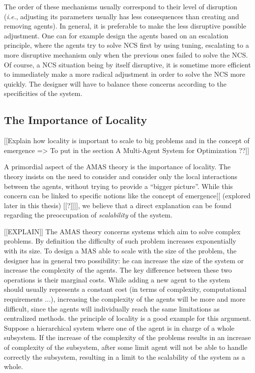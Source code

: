 The order of these mechanisms usually correspond to their level of disruption (\textit{i.e.}, adjusting its parameters usually has less consequences than creating and removing agents). In general, it is preferable to make the less disruptive possible adjustment. One can for example design the agents based on an escalation principle, where the agents try to solve NCS first by using tuning, escalating to a more disruptive mechanism only when the previous ones failed to solve the NCS. Of course, a NCS situation being by itself disruptive, it is sometime more efficient to immediately make a more radical adjustment in order to solve the NCS more quickly. The designer will have to balance these concerns according to the specificities of the system.

\subsection{The Importance of Locality}
[[Explain how locality is important to scale to big problems and in the concept of emergence => To put in the section A Multi-Agent System for Optimization ??]]

A primordial aspect of the AMAS theory is the importance of locality. The theory insists on the need to consider and consider only the local interactions between the agents, without trying to provide a \enquote{bigger picture}. While this concern can be linked to specific notions like the concept of emergence[[ (explored later in this thesis) [[?]]]], we believe that a direct explanation can be found regarding the preoccupation of \emph{scalability} of the system.

[[EXPLAIN]]
The AMAS theory concerns systems which aim to solve complex problems. By definition the difficulty of such problem increases exponentially with its size. To design a MAS able to scale with the size of the problem, the designer has in general two possibility: he can increase the size of the system or increase the complexity of the agents. The key difference between these two operations is their marginal costs. While adding a new agent to the system should usually represents a constant cost (in terms of complexity, computational requirements ...), increasing the complexity of the agents will be more and more difficult, since the agents will individually reach the same limitations as centralized methods. the principle of locality is a good example for this argument. Suppose a hierarchical system where one of the agent is in charge of a whole subsystem. If the increase of the complexity of the problems results in an increase of complexity of the subsystem, after some limit agent will not be able to handle correctly the subsystem, resulting in a limit to the scalability of the system as a whole.

